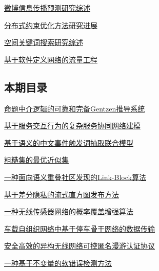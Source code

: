 \documentclass[a4paper]{article}
\begin{document}
\href{http://www.jos.org.cn/ch/reader/download_pdf.aspx?file_no=4944&year_id=2016&quarter_id=2&falg=1}{微博信息传播预测研究综述}

\href{http://www.jos.org.cn/ch/reader/download_pdf.aspx?file_no=4881&year_id=2016&quarter_id=2&falg=1}{分布式约束优化方法研究进展}

\href{http://www.jos.org.cn/ch/reader/download_pdf.aspx?file_no=4934&year_id=2016&quarter_id=2&falg=1}{空间关键词搜索研究综述}

\href{http://www.jos.org.cn/ch/reader/download_pdf.aspx?file_no=4935&year_id=2016&quarter_id=2&falg=1}{基于软件定义网络的流量工程}

\subsection{本期目录}
\href{http://www.jos.org.cn/ch/reader/download_pdf.aspx?file_no=4791&year_id=2016&quarter_id=2&falg=1}{命题中介逻辑的可靠和完备Gentzen推导系统}

\href{http://www.jos.org.cn/ch/reader/download_pdf.aspx?file_no=4847&year_id=2016&quarter_id=2&falg=1}{基于服务交互行为的复杂服务协同网络建模}

\href{http://www.jos.org.cn/ch/reader/download_pdf.aspx?file_no=4833&year_id=2016&quarter_id=2&falg=1}{基于语义的中文事件触发词抽取联合模型}

\href{http://www.jos.org.cn/ch/reader/download_pdf.aspx?file_no=4854&year_id=2016&quarter_id=2&falg=1}{粗糙集的最优近似集}

\href{http://www.jos.org.cn/ch/reader/download_pdf.aspx?file_no=4810&year_id=2016&quarter_id=2&falg=1}{一种面向语义重叠社区发现的Link-Block算法}

\href{http://www.jos.org.cn/ch/reader/download_pdf.aspx?file_no=4863&year_id=2016&quarter_id=2&falg=1}{基于差分隐私的流式直方图发布方法}

\href{http://www.jos.org.cn/ch/reader/download_pdf.aspx?file_no=4837&year_id=2016&quarter_id=2&falg=1}{一种无线传感器网络的概率覆盖增强算法}

\href{http://www.jos.org.cn/ch/reader/download_pdf.aspx?file_no=4839&year_id=2016&quarter_id=2&falg=1}{车载自组织网络中基于停车骨干网络的数据传输}

\href{http://www.jos.org.cn/ch/reader/download_pdf.aspx?file_no=4840&year_id=2016&quarter_id=2&falg=1}{安全高效的异构无线网络可控匿名漫游认证协议}

\href{http://www.jos.org.cn/ch/reader/download_pdf.aspx?file_no=4915&year_id=2016&quarter_id=2&falg=1}{一种基于不变量的软错误检测方法}
\end{document}
